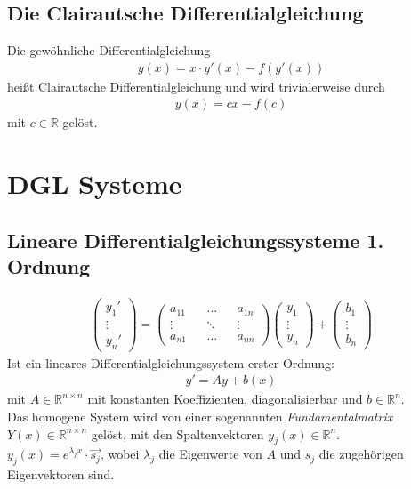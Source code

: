 \subsection{Die Clairautsche Differentialgleichung}
Die gewöhnliche Differentialgleichung 
\begin{align*}
    y(x) = x\cdot y'(x) - f(y'(x))
\end{align*}
heißt Clairautsche Differentialgleichung und wird trivialerweise durch
\begin{align*}
    y(x) = cx - f(c)  
\end{align*}
mit $c \in \mathbb{R}$ gelöst.



\section{DGL Systeme}
\subsection{Lineare Differentialgleichungssysteme 1. Ordnung}

\begin{align*}
    \begin{pmatrix}
        y_1'\\
        \vdots\\
        y_n'
    \end{pmatrix}=
    \begin{pmatrix}
    a_{11} && \dots && a_{1n} \\
    \vdots && \ddots && \vdots \\
    a_{n1} && \dots && a_{nn}
    \end{pmatrix}
    \begin{pmatrix}
        y_1\\
        \vdots\\
        y_n
    \end{pmatrix}+
    \begin{pmatrix}
    b_1\\
    \vdots\\
    b_n
    \end{pmatrix}
\end{align*}
Ist ein lineares Differentialgleichungssystem erster Ordnung:
\begin{align*}
    y'= Ay+b(x)
\end{align*}
mit $A \in \mathbb{R}^{n\times n}$ mit konstanten Koeffizienten, diagonalisierbar und $b \in \mathbb{R}^{n}$.\\
Das homogene System wird von einer sogenannten \emph{Fundamentalmatrix} $Y(x) \in \mathbb{R}^{n\times n}$ gelöst, mit den Spaltenvektoren $y_j(x) \in \mathbb{R}^n$.\\
$y_j(x) = e^{\lambda_j x}\cdot \vec{s_j}$, wobei $\lambda_j$ die Eigenwerte von $A$ und $s_j$ die zugehörigen Eigenvektoren sind.

